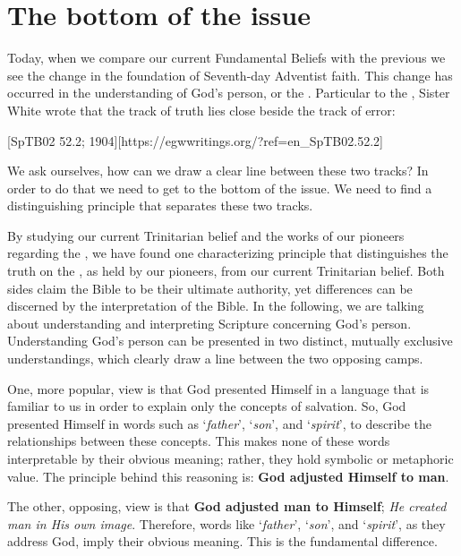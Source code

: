 \chapter{The bottom of the issue}

Today, when we compare our current Fundamental Beliefs with the previous  we see the change in the foundation of Seventh-day Adventist faith. This change has occurred in the understanding of God’s person, or the . Particular to the , Sister White wrote that the track of truth lies close beside the track of error: 

[SpTB02 52.2; 1904][https://egwwritings.org/?ref=en\_SpTB02.52.2]

We ask ourselves, how can we draw a clear line between these two tracks? In order to do that we need to get to the bottom of the issue. We need to find a distinguishing principle that separates these two tracks.

By studying our current Trinitarian belief and the works of our pioneers regarding the , we have found one characterizing principle that distinguishes the truth on the , as held by our pioneers, from our current Trinitarian belief. Both sides claim the Bible to be their ultimate authority, yet differences can be discerned by the interpretation of the Bible. In the following, we are talking about understanding and interpreting Scripture concerning God’s person. Understanding God’s person can be presented in two distinct, mutually exclusive understandings, which clearly draw a line between the two opposing camps.

One, more popular, view is that God presented Himself in a language that is familiar to us in order to explain only the concepts of salvation. So, God presented Himself in words such as ‘\textit{father}’, ‘\textit{son}’, and ‘\textit{spirit}’, to describe the relationships between these concepts. This makes none of these words interpretable by their obvious meaning; rather, they hold symbolic or metaphoric value. The principle behind this reasoning is: \textbf{God adjusted Himself to man}.

The other, opposing, view is that \textbf{God adjusted man to Himself}; \textit{He created man in His own image}. Therefore, words like ‘\textit{father}’, ‘\textit{son}’, and ‘\textit{spirit}’, as they address God, imply their obvious meaning. This is the fundamental difference.

